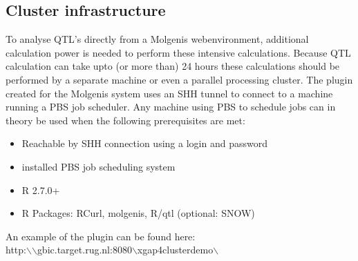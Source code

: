 \subsection{Cluster infrastructure}
To analyse QTL's directly from a Molgenis webenvironment, additional calculation power is needed to perform these intensive calculations. 
Because QTL calculation can take upto (or more than) 24 hours these calculations should be performed by a separate machine 
or even a parallel processing cluster. The plugin created for the Molgenis system uses an SHH tunnel to connect to a machine running a PBS job scheduler. Any machine using PBS to schedule jobs can in theory be used when the following prerequisites are met:
\begin{itemize}
\item Reachable by SHH connection using a login and password
\item installed PBS job scheduling system
\item R 2.7.0+
\item R Packages: RCurl, molgenis, R/qtl (optional: SNOW)
\end{itemize}
An example of the plugin can be found here:\\ http:$\backslash$$\backslash$gbic.target.rug.nl:8080$\backslash$xgap4clusterdemo$\backslash$\\
